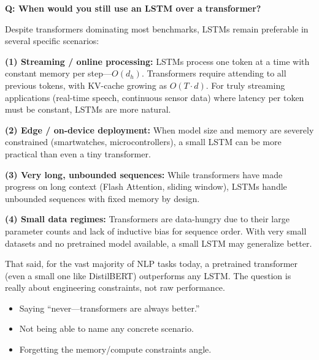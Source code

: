 \begin{interviewq}
\end{interviewq}

\begin{interviewq}
\textbf{Q: When would you still use an LSTM over a transformer?}

 \quad {} \quad
\badgefreq{\freqmed}

\stronganswer
Despite transformers dominating most benchmarks, LSTMs remain preferable
in several specific scenarios:

\textbf{(1) Streaming / online processing:}  LSTMs process one token at a
time with constant memory per step---$O(d_h)$.  Transformers require
attending to all previous tokens, with KV-cache growing as $O(T \cdot d)$.
For truly streaming applications (real-time speech, continuous sensor
data) where latency per token must be constant, LSTMs are more natural.

\textbf{(2) Edge / on-device deployment:}  When model size and memory are
severely constrained (smartwatches, microcontrollers), a small LSTM can
be more practical than even a tiny transformer.

\textbf{(3) Very long, unbounded sequences:}  While transformers have
made progress on long context (Flash Attention, sliding window), LSTMs
handle unbounded sequences with fixed memory by design.

\textbf{(4) Small data regimes:}  Transformers are data-hungry due to
their large parameter counts and lack of inductive bias for sequence
order.  With very small datasets and no pretrained model available, a
small LSTM may generalize better.

That said, for the vast majority of NLP tasks today, a pretrained
transformer (even a small one like DistilBERT) outperforms any LSTM.
The question is really about engineering constraints, not raw
performance.

\redflags
\begin{itemize}
\item Saying ``never---transformers are always better.''
\item Not being able to name any concrete scenario.
\item Forgetting the memory/compute constraints angle.
\end{itemize}



\end{interviewq}
